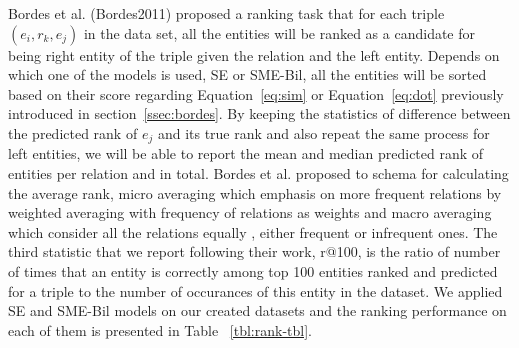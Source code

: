 Bordes et al. (Bordes2011) proposed a ranking task that for each triple $(e_{i} , r_{k}, e_{j} )$ in the data set,
 all the entities will be ranked as a candidate for being right entity of the triple 
 given the relation and the left entity. Depends on which one of the models is used, SE or SME-Bil, all the entities will be sorted
  based on their score regarding Equation~\eqref{eq:sim} or Equation~\ref{eq:dot} previously introduced in section~\ref{ssec:bordes}. 
  By keeping the statistics of difference between the predicted rank of $e_{j}$ and its true rank and also repeat the same process
  for left entities, we will be able to report the mean and median predicted rank of entities per relation and in total. Bordes et al.
   proposed to schema for calculating the average rank, micro averaging which emphasis on more frequent relations by
    weighted averaging with frequency of relations as weights and macro averaging which consider all the relations equally
    , either frequent or infrequent ones. The third statistic that we report following their work, r@100, is the ratio of number of times that 
    an entity is correctly among top 100 entities ranked and predicted for a triple to the number of occurances of this entity in the dataset.
    We applied SE and SME-Bil models on our created datasets and the ranking performance on each of them is presented in Table ~\ref{tbl:rank-tbl}.
	

